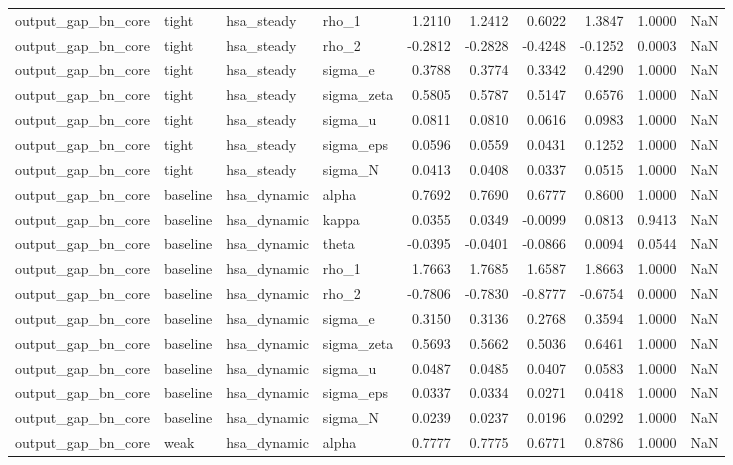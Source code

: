 \begin{tabular}{llllrrrrrl}
output\_gap\_bn\_core & tight & hsa\_steady & rho\_1 & 1.2110 & 1.2412 & 0.6022 & 1.3847 & 1.0000 & NaN \\
output\_gap\_bn\_core & tight & hsa\_steady & rho\_2 & -0.2812 & -0.2828 & -0.4248 & -0.1252 & 0.0003 & NaN \\
output\_gap\_bn\_core & tight & hsa\_steady & sigma\_e & 0.3788 & 0.3774 & 0.3342 & 0.4290 & 1.0000 & NaN \\
output\_gap\_bn\_core & tight & hsa\_steady & sigma\_zeta & 0.5805 & 0.5787 & 0.5147 & 0.6576 & 1.0000 & NaN \\
output\_gap\_bn\_core & tight & hsa\_steady & sigma\_u & 0.0811 & 0.0810 & 0.0616 & 0.0983 & 1.0000 & NaN \\
output\_gap\_bn\_core & tight & hsa\_steady & sigma\_eps & 0.0596 & 0.0559 & 0.0431 & 0.1252 & 1.0000 & NaN \\
output\_gap\_bn\_core & tight & hsa\_steady & sigma\_N & 0.0413 & 0.0408 & 0.0337 & 0.0515 & 1.0000 & NaN \\
output\_gap\_bn\_core & baseline & hsa\_dynamic & alpha & 0.7692 & 0.7690 & 0.6777 & 0.8600 & 1.0000 & NaN \\
output\_gap\_bn\_core & baseline & hsa\_dynamic & kappa & 0.0355 & 0.0349 & -0.0099 & 0.0813 & 0.9413 & NaN \\
output\_gap\_bn\_core & baseline & hsa\_dynamic & theta & -0.0395 & -0.0401 & -0.0866 & 0.0094 & 0.0544 & NaN \\
output\_gap\_bn\_core & baseline & hsa\_dynamic & rho\_1 & 1.7663 & 1.7685 & 1.6587 & 1.8663 & 1.0000 & NaN \\
output\_gap\_bn\_core & baseline & hsa\_dynamic & rho\_2 & -0.7806 & -0.7830 & -0.8777 & -0.6754 & 0.0000 & NaN \\
output\_gap\_bn\_core & baseline & hsa\_dynamic & sigma\_e & 0.3150 & 0.3136 & 0.2768 & 0.3594 & 1.0000 & NaN \\
output\_gap\_bn\_core & baseline & hsa\_dynamic & sigma\_zeta & 0.5693 & 0.5662 & 0.5036 & 0.6461 & 1.0000 & NaN \\
output\_gap\_bn\_core & baseline & hsa\_dynamic & sigma\_u & 0.0487 & 0.0485 & 0.0407 & 0.0583 & 1.0000 & NaN \\
output\_gap\_bn\_core & baseline & hsa\_dynamic & sigma\_eps & 0.0337 & 0.0334 & 0.0271 & 0.0418 & 1.0000 & NaN \\
output\_gap\_bn\_core & baseline & hsa\_dynamic & sigma\_N & 0.0239 & 0.0237 & 0.0196 & 0.0292 & 1.0000 & NaN \\
output\_gap\_bn\_core & weak & hsa\_dynamic & alpha & 0.7777 & 0.7775 & 0.6771 & 0.8786 & 1.0000 & NaN \\

\end{tabular}
